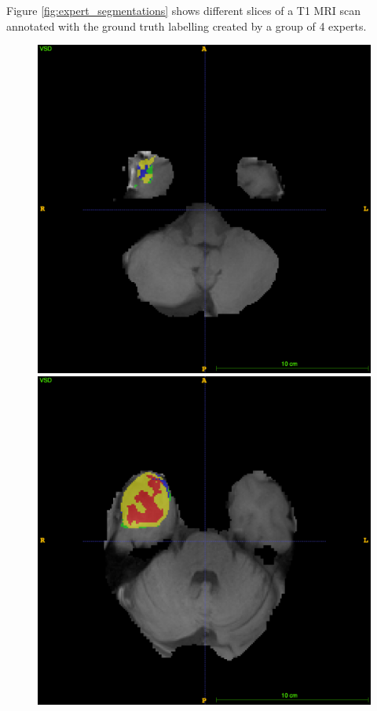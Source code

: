 \documentclass[12pt,a4paper,twoside,openright]{report}
\begin{document}
Figure \ref{fig:expert_segmentations} shows different slices of a T1 MRI scan annotated with the ground truth labelling created by a group of 4 experts.
\begin{figure}[h]
	\centering
	\includegraphics[scale=0.1]{expert_segmentation_49}
	\includegraphics[scale=0.1]{expert_segmentation_59}

\end{figure}
\end{document}
